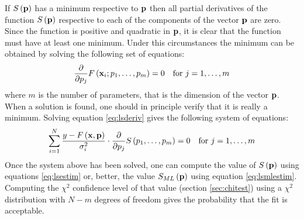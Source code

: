 \documentclass[twoside]{book}
\begin{document}
If $S\left({\bf p}\right)$ has a minimum respective to ${\bf p}$
then all partial derivatives of the function $S\left({\bf
p}\right)$ respective to each of the components of the vector
${\bf p}$ are zero. Since the function is positive and quadratic
in ${\bf p}$, it is clear that the function must have at least one
minimum. Under this circumstances the minimum can be obtained by
solving the following set of equations:
\begin{equation}
\label{eq:lsderiv}
  {\displaystyle \partial\over\displaystyle\partial p_j}
  F\left({\bf x}_i;p_1,\ldots,p_m\right)=0\mbox{\quad for $j=1,\ldots,m$}
\end{equation}
where $m$ is the number of parameters, that is the dimension of
the vector ${\bf p}$. When a solution is found, one should in
principle verify that it is really a minimum. Solving equation
\ref{eq:lsderiv} gives the following system of equations:
\begin{equation}
\label{eq:lsequs}
  \sum_{i=1}^N {
  y-F\left({\bf x},{\bf p}\right)\over \sigma_i^2}\cdot
  {\displaystyle \partial\over\displaystyle\partial p_j} S\left(p_1,\ldots,p_m\right)
  =0\mbox{\quad for $j=1,\ldots,m$}
\end{equation}
Once the system above has been solved, one can compute the value
of $S\left({\bf p}\right)$ using equations \ref{eq:lsestim} or,
better, the value $S_{\mathop{ML}}\left({\bf p}\right)$ using
equation \ref{eq:lsmlestim}. Computing the $\chi^2$ confidence
level of that value (\cf section \ref{sec:chitest}) using a
$\chi^2$ distribution with $N-m$ degrees of freedom gives the
probability that the fit is acceptable.
\end{document}

